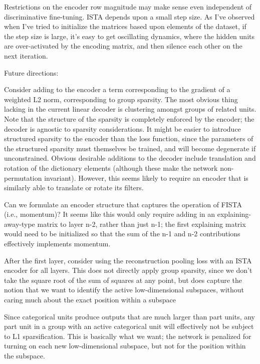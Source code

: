 Restrictions on the encoder row magnitude may make sense even independent of discriminative fine-tuning.  ISTA depends upon a small step size.  As I've observed when I've tried to initialize the matrices based upon elements of the dataset, if the step size is large, it's easy to get oscillating dynamics, where the hidden units are over-activated by the encoding matrix, and then silence each other on the next iteration.








Future directions:

Consider adding to the encoder a term corresponding to the gradient of a weighted L2 norm, corresponding to group sparsity.  The most obvious thing lacking in the current linear decoder is clustering amongst groups of related units.  Note that the structure of the sparsity is completely enforced by the encoder; the decoder is agnostic to sparsity considerations.  It might be easier to introduce structured sparsity to the encoder than the loss function, since the parameters of the structured sparsity must themselves be trained, and will become degenerate if unconstrained.
Obvious desirable additions to the decoder include translation and rotation of the dictionary elements (although these make the network non-permutation invariant).  However, this seems likely to require an encoder that is similarly able to translate or rotate its filters.

Can we formulate an encoder structure that captures the operation of FISTA (i.e., momentum)?  It seems like this would only require adding in an explaining-away-type matrix to layer n-2, rather than just n-1; the first explaining matrix would need to be initialized so that the sum of the n-1 and n-2 contributions effectively implements momentum. 

After the first layer, consider using the reconstruction pooling loss with an ISTA encoder for all layers.  This does not directly apply group sparsity, since we don't take the square root of the sum of squares at any point, but does capture the notion that we want to identify the active low-dimensional subspaces, without caring much about the exact position within a subspace

Since categorical units produce outputs that are much larger than part units, any part unit in a group with an active categorical unit will effectively not be subject to L1 sparsification.  This is basically what we want; the network is penalized for turning on each new low-dimensional subspace, but not for the position within the subspace.  

